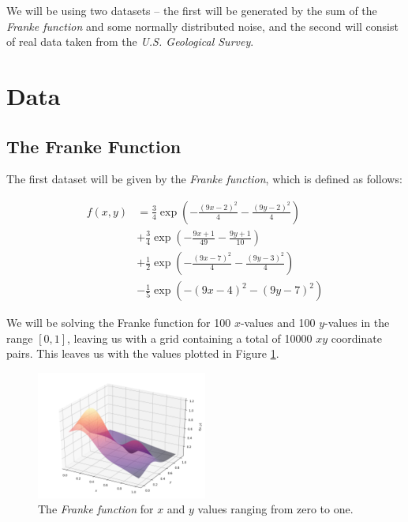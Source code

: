 \documentclass[a4paper,10pt,english]{article}
\begin{document}
We will be using two datasets – the first will be generated by the sum of the \textit{Franke function} and some normally distributed noise, and the second will consist of real data taken from the \textit{U.S. Geological Survey}.

%
%
%



\section*{Data}
\label{sec:data}

\subsection*{The Franke Function}

The first dataset will be given by the \textit{Franke function}, which is defined as follows:

\begin{align*}
f(x,y) &= \frac{3}{4} \exp \left( -\frac{(9x-2)^2}{4} -\frac{(9y-2)^2}{4} \right) \\ &+ \frac{3}{4} \exp \left( -\frac{9x+1}{49} -\frac{9y+1}{10} \right) \\ &+ \frac{1}{2} \exp \left( -\frac{(9x-7)^2}{4} -\frac{(9y-3)^2}{4} \right) \\ &- \frac{1}{5} \exp \left( -(9x-4)^2 - (9y-7)^2 \right)
\end{align*}

We will be solving the Franke function for 100 $x$-values and 100 $y$-values in the range $[0,1]$, leaving us with a grid containing a total of 10000 $xy$ coordinate pairs.  This leaves us with the values plotted in Figure \ref{fig_Franke}.

\begin{figure}[H]
	\centering
	\includegraphics[width = 0.5\textwidth, center]{Franke.png}
	\caption{The \textit{Franke function} for $x$ and $y$ values ranging from zero to one. \label{fig_Franke}}
\end{figure}
\end{document}
